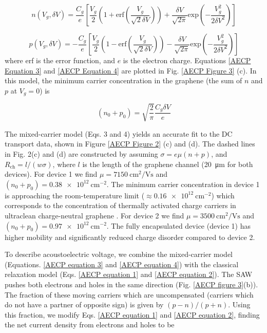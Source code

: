 \documentclass[double,12pt,1in,seploa]{beavtex}
\begin{document}

\begin{equation}
    n(V_g, \delta V) = \frac{C_g}{e}\left[\frac{V_g}{2}\left(1+\mathrm{erf}\left(\frac{V_g}{\sqrt{2}\delta V}\right)\right)+\frac{\delta V}{\sqrt{2\pi}}\mathrm{exp}\left(-\frac{V_g^2}{2\delta V^2}\right)\right]
    \label{AECP Equation 3}
\end{equation}

\begin{equation}
    p(V_g, \delta V) = -\frac{C_g}{e}\left[\frac{V_g}{2}\left(1-\mathrm{erf}\left(\frac{V_g}{\sqrt{2}\delta V}\right)\right)-\frac{\delta V}{\sqrt{2\pi}}\mathrm{exp}\left(-\frac{V_g^2}{2\delta V^2}\right)\right]
    \label{AECP Equation 4}
\end{equation}
where erf is the error function, and $e$ is the electron charge. Equations \ref{AECP Equation 3} and \ref{AECP Equation 4} are plotted in Fig. \ref{AECP Figure 3} (c). In this model, the minimum carrier concentration in the graphene (the sum of $n$ and $p$ at $V_g = 0$) is 

\begin{equation}
    (n_0 + p_0) = \sqrt{\frac{2}{\pi}}\frac{C_g \delta V}{e}
    \label{AECP Equation 5}
\end{equation}

The mixed-carrier model (Eqs. 3 and 4) yields an accurate fit to the DC transport data, shown in Figure \ref{AECP Figure 2} (c) and (d). The dashed lines in Fig. 2(c) and (d) are constructed by assuming $\sigma = e\mu(n + p)$, and $R_{\mathrm{ch}} = l/(w\sigma)$, where $l$ is the length of the graphene channel (\SI{20}{\micro\meter} for both devices). For device 1 we find $\mu = \SI{7150}{\centi\meter^2/\volt\second}$ and $(n_0+p_0) =  \SI{0.38e12}{\centi\meter^{-2}}$. The minimum carrier concentration in device 1 is approaching the room-temperature limit ($\approx \SI{0.16e12}{\centi\meter^{-2}}$) which corresponds to the concentration of thermally activated charge carriers in ultraclean charge-neutral graphene \cite{xin_giant_2023}.  For device 2 we find $\mu = \SI{3500}{\centi\meter^2/\volt\second}$ and $(n_0+p_0) =\SI{0.97e12}{\centi\meter^{-2}}$. The fully encapsulated device (device 1) has higher mobility and significantly reduced charge disorder compared to device 2. 

To describe acoustoelectric voltage, we combine the mixed-carrier model (Equations. \ref{AECP equation 3} and \ref{AECP equation 4}) with the classical relaxation model (Eqs. \ref{AECP equation 1} and \ref{AECP equation 2}). The SAW pushes both electrons and holes in the same direction (Fig. \ref{AECP figure 3}(b)). The fraction of these moving carriers which are uncompensated (carriers which do not have a partner of opposite sign) is given by $(p-n)/(p+n)$.  Using this fraction, we modify Eqs. \ref{AECP equation 1} and \ref{AECP equation 2}, finding the net current density from electrons and holes to be
\end{document}
